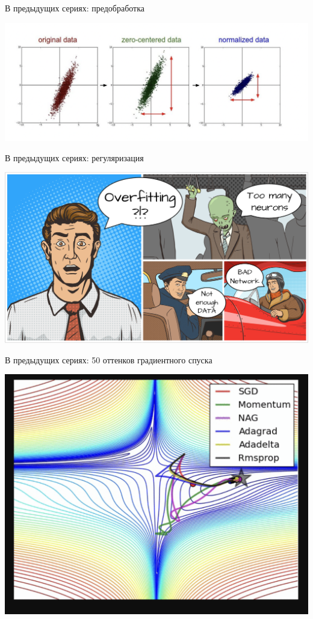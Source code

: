 \documentclass[notes,12pt, aspectratio=169]{beamer}
\begin{document}
\begin{frame}{В предыдущих сериях: предобработка} 
\begin{center}
	\includegraphics[width=.9\linewidth]{prev_prep.png}
\end{center}
\end{frame}

\begin{frame}{В предыдущих сериях: регуляризация} 
\begin{center}
	\includegraphics[width=.9\linewidth]{prev_overfitting.png}
\end{center}
\end{frame}

\begin{frame}{В предыдущих сериях: 50 оттенков градиентного спуска} 
\begin{center}
	\includegraphics[width=.55\linewidth]{prev_grad.png}
\end{center}
\end{frame}
\end{document}
